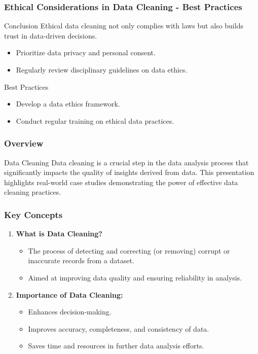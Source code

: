 \documentclass[aspectratio=169]{beamer}
\begin{document}
\begin{frame}[fragile]
    \frametitle{Ethical Considerations in Data Cleaning - Best Practices}
    \begin{block}{Conclusion}
        Ethical data cleaning not only complies with laws but also builds trust in data-driven decisions.
        \begin{itemize}
            \item Prioritize data privacy and personal consent.
            \item Regularly review disciplinary guidelines on data ethics.
        \end{itemize}
    \end{block}

    \begin{block}{Best Practices}
        \begin{itemize}
            \item Develop a data ethics framework.
            \item Conduct regular training on ethical data practices.
        \end{itemize}
    \end{block}
\end{frame}

\begin{frame}[fragile]
    \frametitle{Overview}
    \begin{block}{Data Cleaning}
        Data cleaning is a crucial step in the data analysis process that significantly impacts the quality of insights derived from data. This presentation highlights real-world case studies demonstrating the power of effective data cleaning practices.
    \end{block}
\end{frame}

\begin{frame}[fragile]
    \frametitle{Key Concepts}
    \begin{enumerate}
        \item \textbf{What is Data Cleaning?}
            \begin{itemize}
                \item The process of detecting and correcting (or removing) corrupt or inaccurate records from a dataset.
                \item Aimed at improving data quality and ensuring reliability in analysis.
            \end{itemize}
        \item \textbf{Importance of Data Cleaning:}
            \begin{itemize}
                \item Enhances decision-making.
                \item Improves accuracy, completeness, and consistency of data.
                \item Saves time and resources in further data analysis efforts.
            \end{itemize}
    \end{enumerate}
\end{frame}
\end{document}
